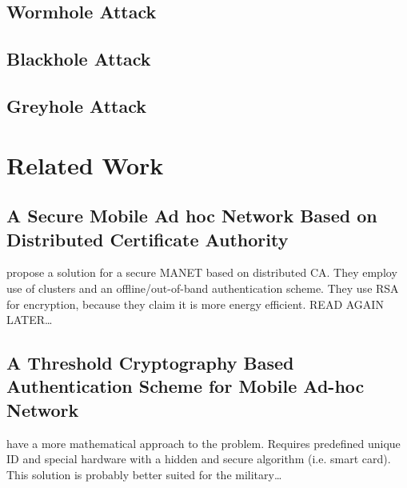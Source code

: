 \subsection{Wormhole Attack}
\subsection{Blackhole Attack}
\subsection{Greyhole Attack}

\section{Related Work}

\subsection{A Secure Mobile Ad hoc Network Based on Distributed Certificate
Authority}
\cite{hosseinisecure} propose a solution for a secure MANET based on distributed
CA. They employ use of clusters and an offline/out-of-band authentication
scheme. They use RSA for encryption, because they claim it is more energy
efficient. READ AGAIN LATER\ldots

\subsection{A Threshold Cryptography Based Authentication Scheme for Mobile
Ad-hoc Network}
\cite{springerlink:Haimabati} have a more mathematical approach
to the problem. Requires predefined unique ID and special hardware with a hidden
and secure algorithm (i.e. smart card). This solution is probably better suited
for the military\ldots
